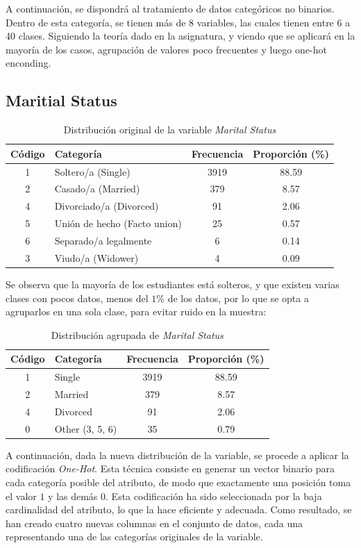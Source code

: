 \documentclass{report}[14pt]
\begin{document}
A continuación, se dispondrá al tratamiento de datos categóricos no binarios. Dentro de esta categoría, se tienen más de 8 variables, las cuales tienen entre 6 a 40 clases. Siguiendo la teoría dado en la asignatura, y viendo que se aplicará en la mayoría de los casos, agrupación de valores poco frecuentes y luego one-hot enconding.

\subsection*{Maritial Status}
\begin{table}[H]
\centering
\begin{tabular}{|c|l|c|c|}
\hline
\textbf{Código} & \textbf{Categoría} & \textbf{Frecuencia} & \textbf{Proporción (\%)} \\
\hline
1 & Soltero/a (Single)              & 3919 & 88.59 \\
2 & Casado/a (Married)             & 379  & 8.57 \\
4 & Divorciado/a (Divorced)        & 91   & 2.06 \\
5 & Unión de hecho (Facto union)   & 25   & 0.57 \\
6 & Separado/a legalmente          & 6    & 0.14 \\
3 & Viudo/a (Widower)              & 4    & 0.09 \\
\hline
\end{tabular}
\caption{Distribución original de la variable \textit{Marital Status}}
\label{tab:marital-status}
\end{table}

Se observa que la mayoría de los estudiantes está solteros, y que existen varias clases con pocos datos, menos del $1\%$ de los datos, por lo que se opta a agruparlos en una sola clase, para evitar ruido en la muestra:
\begin{table}[H]
    \centering
    \begin{tabular}{|c|l|c|c|}
        \hline
        \textbf{Código} & \textbf{Categoría} & \textbf{Frecuencia} & \textbf{Proporción (\%)} \\
        \hline
        1 & Single     & 3919 & 88.59 \\
        2 & Married    & 379  & 8.57 \\
        4 & Divorced   & 91   & 2.06 \\
        0 & Other (3, 5, 6) & 35   & 0.79 \\
        \hline
    \end{tabular}
    \caption{Distribución agrupada de \textit{Marital Status}}
    \label{tab:marital-status-new}
\end{table}
A continuación, dada la nueva distribución de la variable, se procede a aplicar la codificación \textit{One-Hot}. Esta técnica consiste en generar un vector binario para cada categoría posible del atributo, de modo que exactamente una posición toma el valor $1$ y las demás $0$. Esta codificación ha sido seleccionada por la baja cardinalidad del atributo, lo que la hace eficiente y adecuada. Como resultado, se han creado cuatro nuevas columnas en el conjunto de datos, cada una representando una de las categorías originales de la variable.
\end{document}

